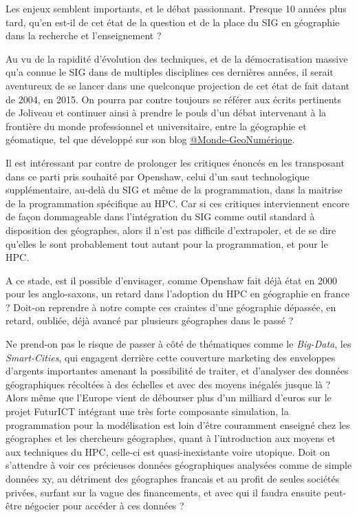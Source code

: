
Les enjeux semblent importants, et le débat passionnant. Presque 10 années plus tard, qu'en est-il de cet état de la question et de la place du SIG en géographie dans la recherche et l'enseignement ?

Au vu de la rapidité d'évolution des techniques, et de la démocratisation massive qu'a connue le SIG dans de multiples disciplines ces dernières années, il serait aventureux de se lancer dans une quelconque projection de cet état de fait datant de 2004, en 2015. On pourra par contre toujours se référer aux écrits pertinents de Joliveau et continuer ainsi à prendre le pouls d'un débat intervenant à la frontière du monde professionnel et universitaire, entre la géographie et géomatique, tel que développé sur son blog \href{https://mondegeonumerique.wordpress.com/}{@Monde-GeoNumérique}.

Il est intéressant par contre de prolonger les critiques énoncés en les transposant dans ce parti pris souhaité par Openshaw, celui d'un saut technologique supplémentaire, au-delà du SIG et même de la programmation, dans la maitrise de la programmation spécifique au HPC. Car si ces critiques interviennent encore de façon dommageable dans l'intégration du SIG comme outil standard à disposition des géographes, alors il n'est pas difficile d'extrapoler, et de se dire qu'elles le sont probablement tout autant pour la programmation, et pour le HPC.

A ce stade, est il possible d'envisager, comme Openshaw fait déjà état en 2000 pour les anglo-saxons, un retard dans l'adoption du HPC en géographie en france ? Doit-on reprendre à notre compte ces craintes d'une géographie dépassée, en retard, oubliée, déjà avancé par plusieurs géographes dans le passé  ?

Ne prend-on pas le risque de passer à côté de thématiques comme le \textit{Big-Data}, les \textit{Smart-Cities}, qui engagent derrière cette couverture marketing des enveloppes d'argents importantes amenant la possibilité de traiter, et d’analyser des données géographiques récoltées à des échelles et avec des moyens inégalés jusque là ? Alors même que l’Europe vient de débourser plus d'un milliard d’euros sur le projet FuturICT intégrant une très forte composante simulation, la programmation pour la modélisation est loin d’être couramment enseigné chez les géographes et les chercheurs géographes, quant à l'introduction aux moyens et aux techniques du HPC, celle-ci est quasi-inexistante voire utopique. Doit on s’attendre à voir ces précieuses données géographiques analysées comme de simple données xy, au détriment des géographes francais et au profit de seules sociétés privées, surfant sur la vague des financements, et avec qui il faudra ensuite peut-être négocier pour accéder à ces données ?

